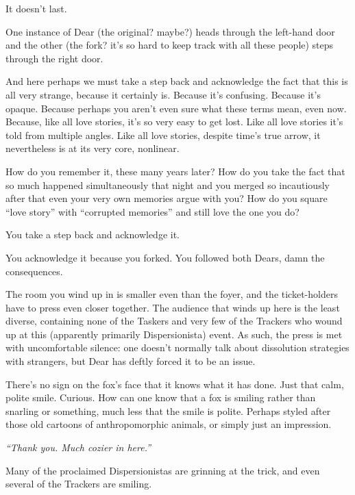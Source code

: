 It doesn't last.

One instance of Dear (the original? maybe?) heads through the left-hand door and the other (the fork? it's so hard to keep track with all these people) steps through the right door.

\newpage

\null
\vfill

And here perhaps we must take a step back and acknowledge the fact that this is all very strange, because it certainly is. Because it's confusing. Because it's opaque. Because perhaps you aren't even sure what these terms mean, even now. Because, like all love stories, it's so very easy to get lost. Like all love stories it's told from multiple angles. Like all love stories, despite time's true arrow, it nevertheless is at its very core, nonlinear.

How do you remember it, these many years later? How do you take the fact that so much happened simultaneously that night and you merged so incautiously after that even your very own memories argue with you? How do you square ``love story'' with ``corrupted memories'' and still love the one you do?

You take a step back and acknowledge it.

You acknowledge it because you forked. You followed both Dears, damn the consequences.

\vfill

\newpage

\null
\vfill

The room you wind up in is smaller even than the foyer, and the ticket-holders have to press even closer together. The audience that winds up here is the least diverse, containing none of the Taskers and very few of the Trackers who wound up at this (apparently primarily Dispersionista) event. As such, the press is met with uncomfortable silence: one doesn't normally talk about dissolution strategies with strangers, but Dear has deftly forced it to be an issue.

There's no sign on the fox's face that it knows what it has done. Just that calm, polite smile. Curious. How can one know that a fox is smiling rather than snarling or something, much less that the smile is polite. Perhaps styled after those old cartoons of anthropomorphic animals, or simply just an impression.

\emph{``Thank you. Much cozier in here.''}

Many of the proclaimed Dispersionistas are grinning at the trick, and even several of the Trackers are smiling.

